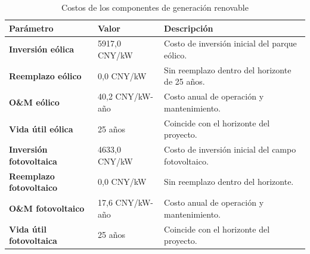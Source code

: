\begin{table}[H]
\centering
\caption{Costos de los componentes de generación renovable}
\label{tab:parametros_costos_renovables_replica}
\begin{tabular}{p{4.2cm} p{3.0cm} p{8.1cm}}
\hline
\textbf{Parámetro} & \textbf{Valor} & \textbf{Descripción} \\
\hline
\textbf{Inversión eólica} & 5917,0 CNY/kW & Costo de inversión inicial del parque eólico. \\
\textbf{Reemplazo eólico} & 0,0 CNY/kW & Sin reemplazo dentro del horizonte de 25 años. \\
\textbf{O\&M eólico} & 40,2 CNY/kW-año & Costo anual de operación y mantenimiento. \\
\textbf{Vida útil eólica} & 25 años & Coincide con el horizonte del proyecto. \\
\textbf{Inversión fotovoltaica} & 4633,0 CNY/kW & Costo de inversión inicial del campo fotovoltaico. \\
\textbf{Reemplazo fotovoltaico} & 0,0 CNY/kW & Sin reemplazo dentro del horizonte. \\
\textbf{O\&M fotovoltaico} & 17,6 CNY/kW-año & Costo anual de operación y mantenimiento. \\
\textbf{Vida útil fotovoltaica} & 25 años & Coincide con el horizonte del proyecto. \\
\hline
\end{tabular}
\end{table}

